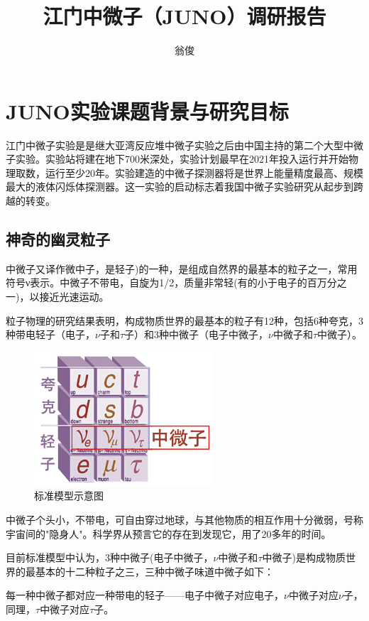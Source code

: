 \documentclass[15pt,a4paper]{article}
\author{翁俊}
\title{江门中微子（JUNO）调研报告}
\begin{document}
\maketitle
\newpage
\tableofcontents
\newpage

\section{JUNO实验课题背景与研究目标} \label{overview}%
江门中微子实验是是继大亚湾反应堆中微子实验之后由中国主持的第二个大型中微子实验。实验站将建在地下700米深处，实验计划最早在2021年投入运行并开始物理取数，运行至少20年。实验建造的中微子探测器将是世界上能量精度最高、规模最大的液体闪烁体探测器。这一实验的启动标志着我国中微子实验研究从起步到跨越的转变。
\subsection{神奇的幽灵粒子}\label{sub:sysover}
中微子又译作微中子，是轻子)的一种，是组成自然界的最基本的粒子之一，常用符号ν表示。中微子不带电，自旋为1/2，质量非常轻(有的小于电子的百万分之一)，以接近光速运动。

粒子物理的研究结果表明，构成物质世界的最基本的粒子有12种，包括6种夸克，3种带电轻子（电子，$\nu$子和$\tau$子）和3种中微子（电子中微子，$\nu$中微子和$\tau$中微子）。

\begin{figure}[ht]
 \centering
 \includegraphics[height=5cm]{images/standarmodel.jpg}
 \caption{标准模型示意图}
 \label{fig:singleblock}
\end{figure}

中微子个头小，不带电，可自由穿过地球，与其他物质的相互作用十分微弱，号称宇宙间的"隐身人"。科学界从预言它的存在到发现它，用了20多年的时间。

目前标准模型中认为，3种中微子(电子中微子，$\nu$中微子和$\tau$中微子)是构成物质世界的最基本的十二种粒子之三，三种中微子味道中微子如下：

每一种中微子都对应一种带电的轻子——电子中微子对应电子，$\nu$中微子对应$\nu$子，同理，$\tau$中微子对应$\tau$子。
\end{document}
